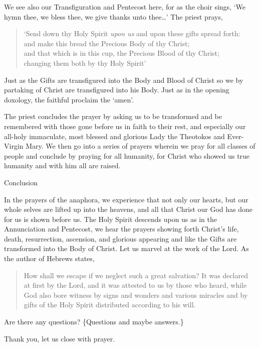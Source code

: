 \documentclass[
]{article}
\begin{document}
We see also our Transfiguration and Pentecost here, for as the choir
sings, `We hymn thee, we bless thee, we give thanks unto thee\ldots{}'
The priest prays,

\begin{quote}
`Send down thy Holy Spirit \emph{upon us} and upon these gifts spread
forth:\\
and make this bread the Precious Body of thy Christ;\\
and that which is in this cup, the Precious Blood of thy Christ;\\
changing them both by thy Holy Spirit'
\end{quote}

Just as the Gifts are transfigured into the Body and Blood of Christ so
we by partaking of Christ are transfigured into his Body. Just as in the
opening doxology, the faithful proclaim the `amen'.

The priest concludes the prayer by asking us to be transformed and be
remembered with those gone before us in faith to their rest, and
especially our all-holy immaculate, most blessed and glorious Lady the
Theotokos and Ever-Virgin Mary. We then go into a series of prayers
wherein we pray for all classes of people and conclude by praying for
all humanity, for Christ who showed us true humanity and with him all
are raised.

Conclusion

In the prayers of the anaphora, we experience that not only our hearts,
but our whole selves are lifted up into the heavens, and all that Christ
our God has done for us is shown before us. The Holy Spirit descends
upon us as in the Annunciation and Pentecost, we hear the prayers
showing forth Christ's life, death, resurrection, ascension, and
glorious appearing and like the Gifts are transformed into the Body of
Christ. Let us marvel at the work of the Lord. As the author of Hebrews
states,

\begin{quote}
How shall we escape if we neglect such a great salvation? It was
declared at first by the Lord, and it was attested to us by those who
heard, while God also bore witness by signs and wonders and various
miracles and by gifts of the Holy Spirit distributed according to his
will.
\end{quote}

Are there any questions? \{Questions and maybe answers.\}

Thank you, let us close with prayer.
\end{document}
